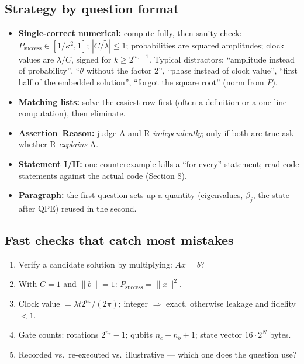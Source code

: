 \documentclass[11pt,a4paper,openany]{book}
\newcommand{\lt}{\tilde\lambda}
\begin{document}
\subsection{Strategy by question format}
\begin{itemize}[itemsep=3pt]
\item \textbf{Single-correct numerical:} compute fully, then sanity-check: $P_{\text{success}}\in[1/\kappa^2, 1]$; $|C/\lt| \le 1$; probabilities are squared amplitudes;
      clock values are $\lambda/C$, signed for $k \ge 2^{n_c-1}$. Typical distractors: ``amplitude instead of probability'', ``$\theta$ without the factor 2'',
      ``phase instead of clock value'', ``first half of the embedded solution'', ``forgot the square root'' (norm from $P$).
\item \textbf{Matching lists:} solve the easiest row first (often a definition or a one-line computation), then eliminate.
\item \textbf{Assertion--Reason:} judge A and R \emph{independently}; only if both are true ask whether R \emph{explains} A.
\item \textbf{Statement I/II:} one counterexample kills a ``for every'' statement; read code statements against the actual code (Section 8).
\item \textbf{Paragraph:} the first question sets up a quantity (eigenvalues, $\beta_j$, the state after QPE) reused in the second.
\end{itemize}
\subsection{Fast checks that catch most mistakes}
\begin{enumerate}[itemsep=2pt]
\item Verify a candidate solution by multiplying: $Ax = b$?
\item With $C = 1$ and $\|b\| = 1$: $P_{\text{success}} = \|x\|^2$.
\item Clock value $= \lambda t2^{n_c}/(2\pi)$; integer $\Rightarrow$ exact, otherwise leakage and fidelity $< 1$.
\item Gate counts: rotations $2^{n_c} - 1$; qubits $n_c + n_b + 1$; state vector $16\cdot2^N$ bytes.
\item Recorded vs.\ re-executed vs.\ illustrative --- which one does the question use?
\end{enumerate}
\end{document}
